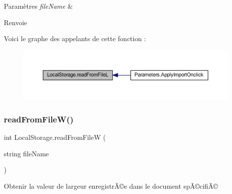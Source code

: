\begin{DoxyParams}{Paramètres}
{\em file\+Name} & \\
\hline
\end{DoxyParams}
\begin{DoxyReturn}{Renvoie}

\end{DoxyReturn}
Voici le graphe des appelants de cette fonction \+:\nopagebreak
\begin{figure}[H]
\begin{center}
\leavevmode
\includegraphics[width=350pt]{class_local_storage_a2216bc871c8298023f62119bcdf7edb4_icgraph}
\end{center}
\end{figure}
\mbox{\label{class_local_storage_aef684ee38f8d4dccf157503ec6d04a7a}} 
\subsubsection{\texorpdfstring{read\+From\+File\+W()}{readFromFileW()}}
{\footnotesize\ttfamily int Local\+Storage.\+read\+From\+FileW (\begin{DoxyParamCaption}\item[{string}]{file\+Name }\end{DoxyParamCaption})\hspace{0.3cm}{\ttfamily [inline]}}



Obtenir la valeur de largeur enregistrÃ©e dans le document spÃ©cifiÃ© 


